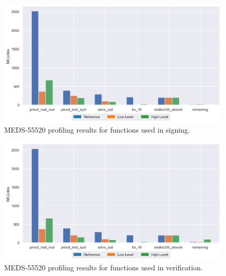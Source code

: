 \documentclass[11pt,a4paper]{report}
\theoremstyle{definition}
\begin{document}
\begin{figure}
  \centering
  \includegraphics[width=\textwidth]{plots/barplot_MEDS-55520_profile_sign.png}
  \caption{MEDS-55520 profiling results for functions used in signing.}
  \label{fig:results_profile_signing_MEDS-55520}
\end{figure}

\begin{figure}
  \centering
  \includegraphics[width=\textwidth]{plots/barplot_MEDS-55520_profile_verify.png}
  \caption{MEDS-55520 profiling results for functions used in verification.}
  \label{fig:results_profile_verify_MEDS-55520}
\end{figure}
\end{document}
